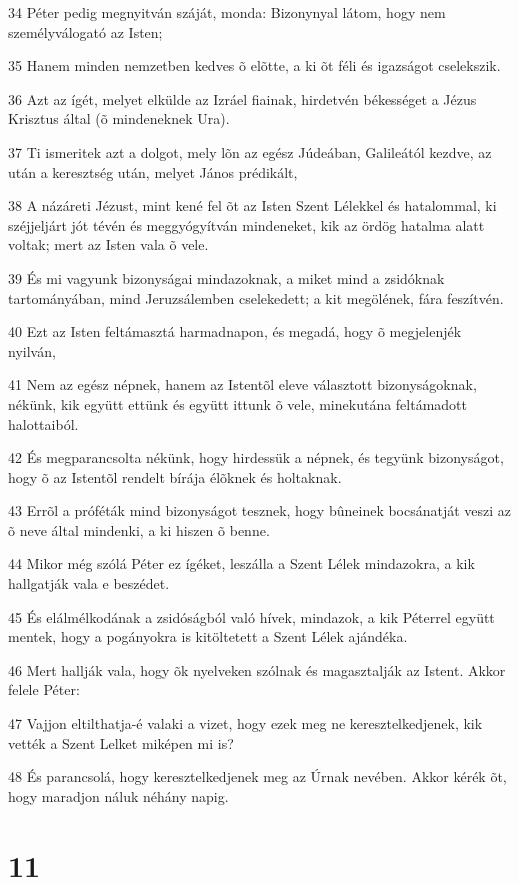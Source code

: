 \par 34 Péter pedig megnyitván száját, monda: Bizonynyal látom, hogy nem személyválogató az Isten;
\par 35 Hanem minden nemzetben kedves õ elõtte, a ki õt féli és igazságot cselekszik.
\par 36 Azt az ígét, melyet elkülde az Izráel fiainak, hirdetvén békességet a Jézus Krisztus által (õ mindeneknek Ura).
\par 37 Ti ismeritek azt a dolgot, mely lõn az egész Júdeában, Galileától kezdve, az után a keresztség után, melyet János prédikált,
\par 38 A názáreti Jézust, mint kené fel õt az Isten Szent Lélekkel és hatalommal, ki széjjeljárt jót tévén és meggyógyítván mindeneket, kik az ördög hatalma alatt voltak; mert az Isten vala õ vele.
\par 39 És mi vagyunk bizonyságai mindazoknak, a miket mind a zsidóknak tartományában, mind Jeruzsálemben cselekedett; a kit megölének, fára feszítvén.
\par 40 Ezt az Isten feltámasztá harmadnapon, és megadá, hogy õ megjelenjék nyilván,
\par 41 Nem az egész népnek, hanem az Istentõl eleve választott bizonyságoknak, nékünk, kik együtt ettünk és együtt ittunk õ vele, minekutána feltámadott halottaiból.
\par 42 És megparancsolta nékünk, hogy hirdessük a népnek, és tegyünk bizonyságot, hogy õ az Istentõl rendelt bírája  élõknek és holtaknak.
\par 43 Errõl a próféták mind bizonyságot tesznek, hogy bûneinek bocsánatját veszi az õ neve által mindenki, a ki hiszen õ benne.
\par 44 Mikor még szólá Péter ez ígéket, leszálla a Szent Lélek mindazokra, a kik hallgatják vala e beszédet.
\par 45 És elálmélkodának a zsidóságból való hívek, mindazok, a kik Péterrel együtt mentek, hogy a pogányokra is kitöltetett a Szent Lélek ajándéka.
\par 46 Mert hallják vala, hogy õk nyelveken szólnak és magasztalják az Istent. Akkor felele Péter:
\par 47 Vajjon eltilthatja-é valaki a vizet, hogy ezek meg ne keresztelkedjenek, kik vették a Szent Lelket  miképen mi is?
\par 48 És parancsolá, hogy keresztelkedjenek meg az Úrnak nevében. Akkor kérék õt, hogy maradjon náluk néhány napig.

\chapter{11}


